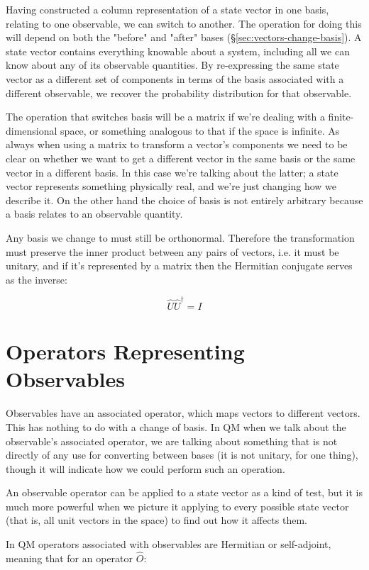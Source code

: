 Having constructed a column representation of a state vector in one basis, relating to one observable, we can switch to another. The operation for doing this will depend on both the "before" and "after" bases (§\ref{sec:vectors-change-basis}). A state vector contains everything knowable about a system, including all we can know about any of its observable quantities. By re-expressing the same state vector as a different set of components in terms of the basis associated with a different observable, we recover the probability distribution for that observable.

The operation that switches basis will be a matrix if we're dealing with a finite-dimensional space, or something analogous to that if the space is infinite. As always when using a matrix to transform a vector's components we need to be clear on whether we want to get a different vector in the same basis or the same vector in a different basis. In this case we're talking about the latter; a state vector represents something physically real, and we're just changing how we describe it. On the other hand the choice of basis is not entirely arbitrary because a basis relates to an observable quantity.

Any basis we change to must still be orthonormal. Therefore the transformation must preserve the inner product between any pairs of vectors, i.e. it must be unitary, and if it's represented by a matrix then the Hermitian conjugate serves as the inverse:

$$\hat{U} \hat{U}^\dagger = I$$

\section{Operators Representing Observables} \label{sec:qm-operators1}

Observables have an associated operator, which maps vectors to different vectors. This has nothing to do with a change of basis. In QM when we talk about the observable's associated operator, we are talking about something that is not directly of any use for converting between bases (it is not unitary, for one thing), though it will indicate how we could perform such an operation.

An observable operator can be applied to a state vector as a kind of test, but it is much more powerful when we picture it applying to every possible state vector (that is, all unit vectors in the space) to find out how it affects them.

In QM operators associated with observables are Hermitian or self-adjoint, meaning that for an operator $\hat{O}$:

